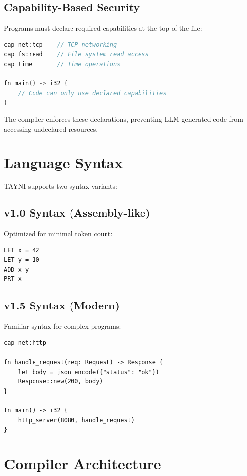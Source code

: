 \documentclass[11pt,a4paper]{article}
\begin{document}
\subsection{Capability-Based Security}

Programs must declare required capabilities at the top of the file:

\begin{lstlisting}[language=C,caption=Capability declaration]
cap net:tcp    // TCP networking
cap fs:read    // File system read access
cap time       // Time operations

fn main() -> i32 {
    // Code can only use declared capabilities
}
\end{lstlisting}

The compiler enforces these declarations, preventing LLM-generated code from accessing undeclared resources.

\section{Language Syntax}

TAYNI supports two syntax variants:

\subsection{v1.0 Syntax (Assembly-like)}

Optimized for minimal token count:

\begin{lstlisting}[caption=TAYNI v1.0 example]
LET x = 42
LET y = 10
ADD x y
PRT x
\end{lstlisting}

\subsection{v1.5 Syntax (Modern)}

Familiar syntax for complex programs:

\begin{lstlisting}[caption=TAYNI v1.5 example]
cap net:http

fn handle_request(req: Request) -> Response {
    let body = json_encode({"status": "ok"})
    Response::new(200, body)
}

fn main() -> i32 {
    http_server(8080, handle_request)
}
\end{lstlisting}

\section{Compiler Architecture}
\end{document}
